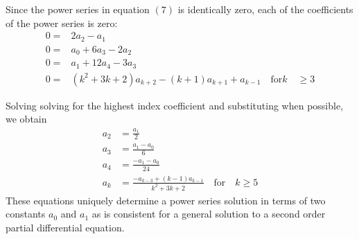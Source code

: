 \documentclass{article}
\begin{document}
    Since the power series in equation $(7)$ is identically zero, each of the coefficients of the power series is zero:
    \begin{equation}
    \begin{split}
    	0 = & 2a_{2}-a_{1} \\ 
    	0 = & a_{0}+6a_{3}-2a_{2} \\
    	0 = & a_{1}+12a_{4}-3a_{3} \\
    	0 = & (k^{2}+3k+2)a_{k+2} -(k+1)a_{k+1} + a_{k-1} \quad \textrm{for}k  \quad \geq 3
    \end{split}
    \end{equation}
    
    Solving solving for the highest index coefficient and substituting when possible, we obtain
    \begin{equation}
    \begin{split}
    	a_{2} & = \frac{a_{1}}{2} \\ 
    	a_{3} & = \frac{a_{1}-a_{0}}{6} \\
    	a_{4} & = \frac{-a_{1}-a_{0}}{24} \\
    	a_{k} & = \frac{-a_{k-3}+(k-1)a_{k-1}}{k^{2}+3k+2} \quad \textrm{for} \quad k \geq 5
    \end{split}
    \end{equation}
    These equations uniquely determine a power series solution in terms of two constants $a_{0}$ and $a_{1}$ as is consistent for a general solution to a second order partial differential equation.
\end{document}
